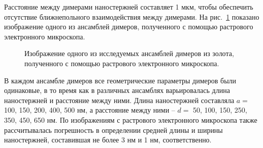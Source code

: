 Расстояние между димерами наностержней составляет 1 мкм, чтобы обеспечить отсутствие ближнепольного взаимодействия между димерами. На рис.~\ref{img:SEMsample} показано изображение одного из ансамблей димеров, полученного с помощью растрового электронного микроскопа.
\begin{figure}[!h]
\caption{Изображение одного из исследуемых ансамблей димеров из золота, полученного с помощью растрового электронного микроскопа.}
\label{img:SEMsample}
\end{figure}
В каждом ансамбле димеров все геометрические параметры димеров были одинаковые, в то время как в различных ансамблях варьировалась длина наностержней и расстояние между ними. Длина наностержней составляла $ a = $ 100, 150, 200, 400, 500 нм, а расстояние между ними -- $ d = $ 50, 100, 150, 250, 350, 450, 650 нм. По изображениям с растрового электронного микроскопа также рассчитывалась погрешность в определении средней длины и ширины наностержней, составившая не более 3 нм и 1 нм, соответственно.

